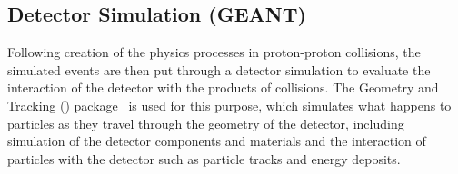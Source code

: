 \subsection{Detector Simulation (GEANT)}
\label{ss:detector_simulation}
Following creation of the physics processes in proton-proton collisions, the simulated events are then put
through a detector simulation to evaluate the interaction of the detector with the products of collisions. The
Geometry and Tracking (\GEANT) package~\cite{Agostinelli:2002hh,Allison:2006ve} is used for this
purpose, which simulates what happens to particles as they travel through the geometry of the detector,
including simulation of the detector components and materials and the interaction of particles with the
detector such as particle tracks and energy deposits.